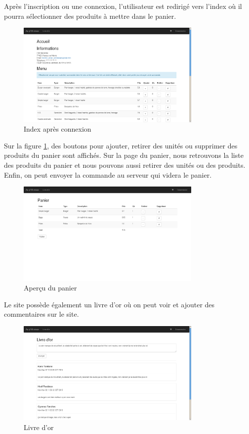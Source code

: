 Après l'inscription ou une connexion, l'utilisateur est redirigé vers
l'index où il pourra sélectionner des produits à mettre dans le panier.

\begin{figure}[H]
	\centering
	\includegraphics[width=0.8\textwidth]{res/afterConnexion.png}
	\caption{Index après connexion}
	\label{fig:logged}
\end{figure}

Sur la figure \ref{fig:logged}, des boutons pour ajouter, retirer des unités ou
supprimer des produits du panier sont affichés. Sur la page du panier, nous
retrouvons la liste des produits du panier et nous pouvons aussi retirer des
unités ou des produits. Enfin, on peut envoyer la commande au serveur qui
videra le panier.

\begin{figure}[H]
	\centering
	\includegraphics[width=0.8\textwidth]{res/panier.png}
	\caption{Aperçu du panier}
	\label{fig:cart}
\end{figure}

Le site possède également un livre d'or où on peut voir et ajouter des
commentaires sur le site.

\begin{figure}[H]
	\centering
	\includegraphics[width=0.8\textwidth]{res/livre_comment.png}
	\caption{Livre d'or}
	\label{fig:guestbook}
\end{figure}

